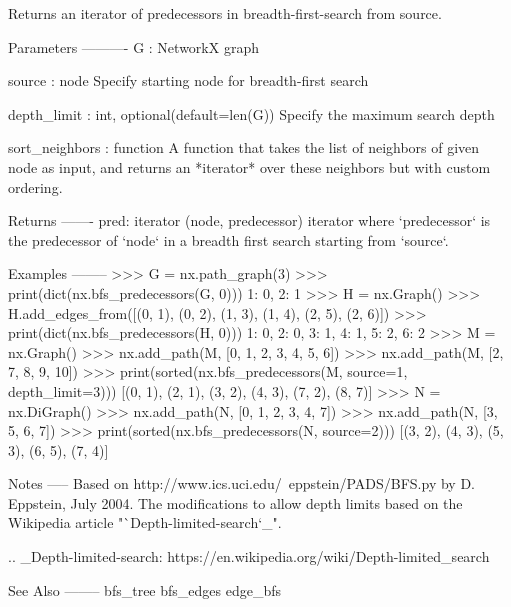 \begin{DoxyVerb}Returns an iterator of predecessors in breadth-first-search from source.

Parameters
----------
G : NetworkX graph

source : node
   Specify starting node for breadth-first search

depth_limit : int, optional(default=len(G))
    Specify the maximum search depth

sort_neighbors : function
    A function that takes the list of neighbors of given node as input, and
    returns an *iterator* over these neighbors but with custom ordering.

Returns
-------
pred: iterator
    (node, predecessor) iterator where `predecessor` is the predecessor of
    `node` in a breadth first search starting from `source`.

Examples
--------
>>> G = nx.path_graph(3)
>>> print(dict(nx.bfs_predecessors(G, 0)))
{1: 0, 2: 1}
>>> H = nx.Graph()
>>> H.add_edges_from([(0, 1), (0, 2), (1, 3), (1, 4), (2, 5), (2, 6)])
>>> print(dict(nx.bfs_predecessors(H, 0)))
{1: 0, 2: 0, 3: 1, 4: 1, 5: 2, 6: 2}
>>> M = nx.Graph()
>>> nx.add_path(M, [0, 1, 2, 3, 4, 5, 6])
>>> nx.add_path(M, [2, 7, 8, 9, 10])
>>> print(sorted(nx.bfs_predecessors(M, source=1, depth_limit=3)))
[(0, 1), (2, 1), (3, 2), (4, 3), (7, 2), (8, 7)]
>>> N = nx.DiGraph()
>>> nx.add_path(N, [0, 1, 2, 3, 4, 7])
>>> nx.add_path(N, [3, 5, 6, 7])
>>> print(sorted(nx.bfs_predecessors(N, source=2)))
[(3, 2), (4, 3), (5, 3), (6, 5), (7, 4)]

Notes
-----
Based on http://www.ics.uci.edu/~eppstein/PADS/BFS.py
by D. Eppstein, July 2004. The modifications
to allow depth limits based on the Wikipedia article
"`Depth-limited-search`_".

.. _Depth-limited-search: https://en.wikipedia.org/wiki/Depth-limited_search

See Also
--------
bfs_tree
bfs_edges
edge_bfs
\end{DoxyVerb}
 \mbox{\label{namespacenetworkx_1_1algorithms_1_1traversal_1_1breadth__first__search_a15e4b195f02a35fe3145e21d140ccee7}} 
